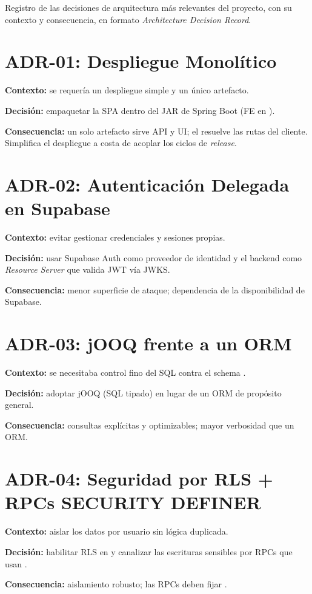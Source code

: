 Registro de las decisiones de arquitectura más relevantes del proyecto, con su contexto y
consecuencia, en formato \textit{Architecture Decision Record}.\par

\section{ADR-01: Despliegue Monolítico}
\label{sec:adr_monolito}
\textbf{Contexto:} se requería un despliegue simple y un único artefacto.\par
\textbf{Decisión:} empaquetar la SPA dentro del JAR de Spring Boot (FE en ).\par
\textbf{Consecuencia:} un solo artefacto sirve API y UI; el  resuelve
las rutas del cliente. Simplifica el despliegue a costa de acoplar los ciclos de \textit{release}.

\section{ADR-02: Autenticación Delegada en Supabase}
\label{sec:adr_auth}
\textbf{Contexto:} evitar gestionar credenciales y sesiones propias.\par
\textbf{Decisión:} usar Supabase Auth como proveedor de identidad y el backend como
\textit{Resource Server} que valida JWT vía JWKS.\par
\textbf{Consecuencia:} menor superficie de ataque; dependencia de la disponibilidad de Supabase.

\section{ADR-03: jOOQ frente a un ORM}
\label{sec:adr_jooq}
\textbf{Contexto:} se necesitaba control fino del SQL contra el schema .\par
\textbf{Decisión:} adoptar jOOQ (SQL tipado) en lugar de un ORM de propósito general.\par
\textbf{Consecuencia:} consultas explícitas y optimizables; mayor verbosidad que un ORM.

\section{ADR-04: Seguridad por RLS + RPCs SECURITY DEFINER}
\label{sec:adr_rls}
\textbf{Contexto:} aislar los datos por usuario sin lógica duplicada.\par
\textbf{Decisión:} habilitar RLS en  y canalizar las escrituras sensibles por RPCs
 que usan .\par
\textbf{Consecuencia:} aislamiento robusto; las RPCs deben fijar .


